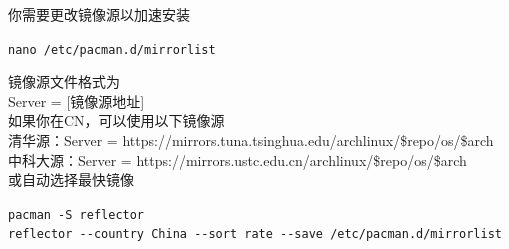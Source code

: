 \documentclass{article}
\newenvironment{singlecolumn}{
	\par
	\noindent
	\begin{minipage}[t]{\textwidth} 
		\setlength{\parfillskip}{0pt plus 1fil} 
	}{%
	\end{minipage}
	\par
}
\begin{document}
\begin{singlecolumn}
你需要更改镜像源以加速安装\\
\begin{tcolorbox}[
	title=bash,
	boxrule=1pt,
	fonttitle=\bfseries,
	listing only, 
	listing options={language=bash}
	]
	\verb|nano /etc/pacman.d/mirrorlist|\\
\end{tcolorbox}
镜像源文件格式为\\
\textcolor{code}{Server = [镜像源地址]}\\
如果你在CN，可以使用以下镜像源\\
清华源：\textcolor{code}{Server = https://mirrors.tuna.tsinghua.edu/archlinux/\$repo/os/\$arch}\\
中科大源：\textcolor{code}{Server = https://mirrors.ustc.edu.cn/archlinux/\$repo/os/\$arch}\\
或自动选择最快镜像\\
\begin{tcolorbox}[
	title=bash,
	boxrule=1pt,
	fonttitle=\bfseries,
	listing only, 
	listing options={language=bash}
	]
	\verb|pacman -S reflector|\\
	\verb|reflector --country China --sort rate --save /etc/pacman.d/mirrorlist|\\
\end{tcolorbox}

\medskip

\end{singlecolumn}
\pagebreak
\end{document}

